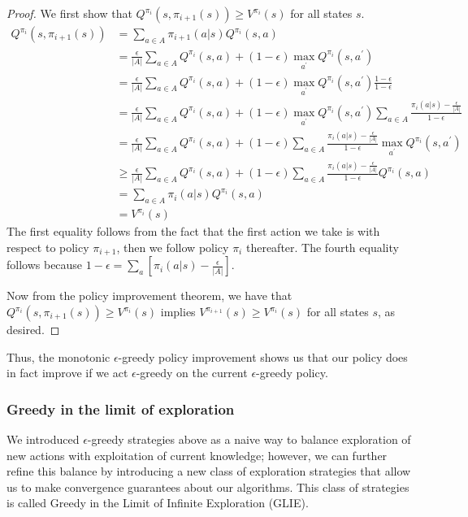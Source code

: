 \documentclass{article}
\theoremstyle{definition}
\theoremstyle{remark}
\begin{document}
\begin{proof}
We first show that $Q^{\pi_i}(s, \pi_{i+1}(s)) \geq V^{\pi_i}(s)$ for all states $s$.
\begin{align*}
Q^{\pi_{i}}(s,\pi_{i+1}(s)) &= \sum_{a \in A} \pi_{i+1}(a|s) Q^{\pi_i}(s,a) \\
	&= \frac{\epsilon}{|A|}\sum_{a \in A} Q^{\pi_i}(s,a) + (1-\epsilon) \max_{a^\prime} Q^{\pi_i}(s,a^\prime) \\
	&= \frac{\epsilon}{|A|}\sum_{a \in A} Q^{\pi_i}(s,a) + (1-\epsilon) \max_{a^\prime} Q^{\pi_i}(s,a^\prime) \frac{1-\epsilon}{1-\epsilon} \\
	&= \frac{\epsilon}{|A|}\sum_{a \in A} Q^{\pi_i}(s,a) + (1-\epsilon) \max_{a^\prime} Q^{\pi_i}(s,a^\prime) \sum_{a \in A} \frac{\pi_i(a|s) - \frac{\epsilon}{|A|}}{1-\epsilon} \\
	&= \frac{\epsilon}{|A|}\sum_{a \in A} Q^{\pi_i}(s,a) + (1-\epsilon) \sum_{a \in A} \frac{\pi_i(a|s) - \frac{\epsilon}{|A|}}{1-\epsilon} \max_{a^\prime} Q^{\pi_i}(s,a^\prime) \\
	&\geq \frac{\epsilon}{|A|}\sum_{a \in A} Q^{\pi_i}(s,a) + (1-\epsilon) \sum_{a \in A} \frac{\pi_i(a|s) - \frac{\epsilon}{|A|}}{1-\epsilon} Q^{\pi_i}(s,a) \\
	&= \sum_{a \in A} \pi_i(a|s) Q^{\pi_i}(s,a) \\
	&= V^{\pi_i}(s)
\end{align*}
The first equality follows from the fact that the first action we take is with respect to policy $\pi_{i+1}$, then we follow policy $\pi_i$ thereafter.  The fourth equality follows because $1-\epsilon = \sum_a \left[\pi_i(a|s) - \frac{\epsilon}{|A|}\right]$.

Now from the policy improvement theorem, we have that $Q^{\pi_i}(s, \pi_{i+1}(s)) \geq V^{\pi_i}(s)$ implies $V^{\pi_{i+1}}(s) \geq V^{\pi_i}(s)$ for all states $s$, as desired.
\end{proof}

Thus, the monotonic $\epsilon$-greedy policy improvement shows us that our policy does in fact improve if we act $\epsilon$-greedy on the current $\epsilon$-greedy policy.

\subsubsection{Greedy in the limit of exploration}
We introduced $\epsilon$-greedy strategies above as a naive way to balance exploration of new actions with exploitation of current knowledge; however, we can further refine this balance by introducing a new class of exploration strategies that allow us to make convergence guarantees about our algorithms.  This class of strategies is called Greedy in the Limit of Infinite Exploration (GLIE).
\end{document}
